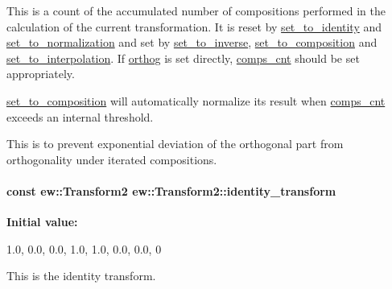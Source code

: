 \label{classew_1_1Transform2_a4fafd08e5f15d46f675237f2ff2adc2c}
This is a count of the accumulated number of compositions performed in the calculation of the current transformation. It is reset by \hyperlink{classew_1_1Transform2_aa6447021754fc0ac96b5b73aa54de22e}{set\_\-to\_\-identity} and \hyperlink{classew_1_1Transform2_a98771ebfe08e76140e43d5fc36bf9d32}{set\_\-to\_\-normalization} and set by \hyperlink{classew_1_1Transform2_abdd12e03e96277ee83c8f439dd00821f}{set\_\-to\_\-inverse}, \hyperlink{classew_1_1Transform2_a4d46e2ff4c77823f87be5e837f65673d}{set\_\-to\_\-composition} and \hyperlink{classew_1_1Transform2_adc9f7b87aa3b37f325d73a501d3a1bf2}{set\_\-to\_\-interpolation}. If \hyperlink{classew_1_1Transform2_a5f6c8c35d5086112e08355556dae6cea}{orthog} is set directly, \hyperlink{classew_1_1Transform2_a4fafd08e5f15d46f675237f2ff2adc2c}{comps\_\-cnt} should be set appropriately.

\hyperlink{classew_1_1Transform2_a4d46e2ff4c77823f87be5e837f65673d}{set\_\-to\_\-composition} will automatically normalize its result when \hyperlink{classew_1_1Transform2_a4fafd08e5f15d46f675237f2ff2adc2c}{comps\_\-cnt} exceeds an internal threshold.

This is to prevent exponential deviation of the orthogonal part from orthogonality under iterated compositions. \hypertarget{classew_1_1Transform2_adce517699e0386d252283bc37ede5cbf}{
\paragraph[{identity\_\-transform}]{\setlength{\rightskip}{0pt plus 5cm}const {\bf ew::Transform2} {\bf ew::Transform2::identity\_\-transform}}\hfill}
\label{classew_1_1Transform2_adce517699e0386d252283bc37ede5cbf}
{\bfseries Initial value:}
\begin{DoxyCode}
 {
  {{1.0, 0.0}, {0.0, 1.0}},
  1.0,
  {0.0, 0.0},
  0
}
\end{DoxyCode}
This is the identity transform. 